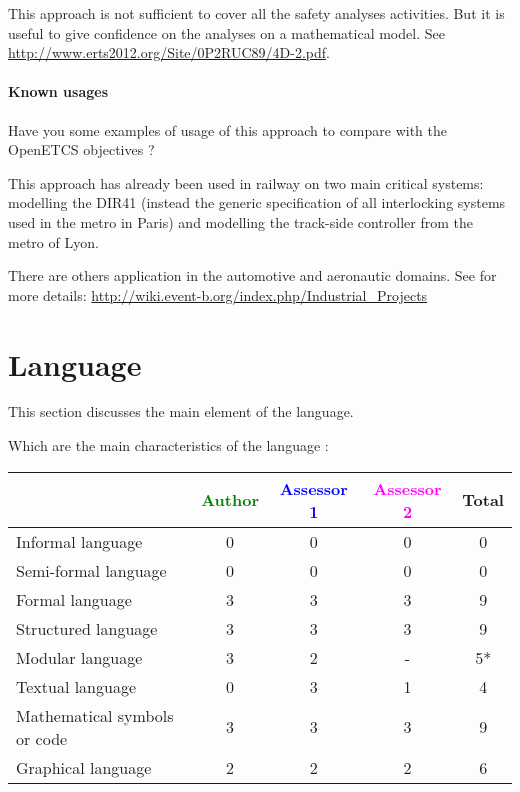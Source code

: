 \begin{author_comment}
This approach is not sufficient to cover all the safety analyses activities. But it is useful to give confidence on the analyses on a mathematical model. See \url{http://www.erts2012.org/Site/0P2RUC89/4D-2.pdf}.
\end{author_comment}


\paragraph{Known usages} Have you some examples of usage of this approach to  compare with the OpenETCS objectives ?


\begin{author_comment}
This approach has already been used in railway on two  main critical systems: modelling the DIR41 (instead the generic specification of all interlocking systems used in the metro in Paris)  and modelling the track-side controller from the metro of Lyon. 

There are others application in the automotive and aeronautic domains. See for more details: \url{http://wiki.event-b.org/index.php/Industrial_Projects}
\end{author_comment}


\section{Language}
This section discusses the main element of the language.

Which are the main characteristics of the language :

\begin{tabular}{|l | c | c | c | c|}
\hline
& \textcolor{green}{Author} & \textcolor{blue}{Assessor 1} & \textcolor{magenta}{Assessor 2} & Total \\
\hline 
Informal language & 0 & 0 & 0 & 0  \\
\hline 
Semi-formal language & 0 & 0 & 0 & 0 \\
\hline
Formal language & 3 & 3 & 3 & 9 \\
\hline
Structured language & 3 & 3 & 3 & 9 \\
\hline
Modular language & 3 & 2 & - & 5* \\
\hline
Textual language & 0 & 3 & 1 & 4 \\
\hline
Mathematical symbols or code & 3 & 3 & 3 & 9 \\
\hline
Graphical language & 2 & 2 & 2 & 6 \\
\hline
\end{tabular}

